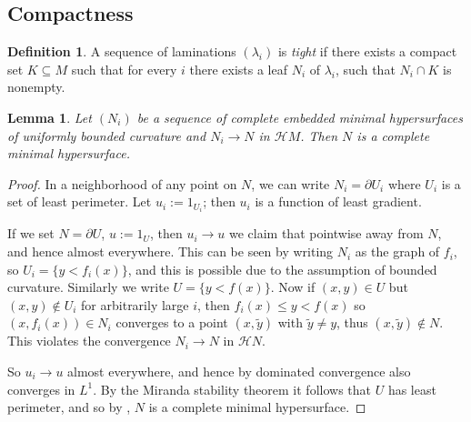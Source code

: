 \documentclass[reqno,11pt]{amsart}
\newcommand{\Hypspace}{\mathscr H}
\newcommand{\dfn}[1]{\emph{#1}\index{#1}}
\newtheorem{lemma}[theorem]{Lemma}
\theoremstyle{definition}
\newtheorem{definition}[theorem]{Definition}
\numberwithin{equation}{section}
\begin{document}
\subsection{Compactness}
\begin{definition}
A sequence of laminations $(\lambda_i)$ is \dfn{tight} if there exists a compact set $K \subseteq M$ such that for every $i$ there exists a leaf $N_i$ of $\lambda_i$, such that $N_i \cap K$ is nonempty.
\end{definition}

\begin{lemma}\label{limit of minimals is minimal}
Let $(N_i)$ be a sequence of complete embedded minimal hypersurfaces of uniformly bounded curvature and $N_i \to N$ in $\Hypspace M$.
Then $N$ is a complete minimal hypersurface.
\end{lemma}
\begin{proof}
In a neighborhood of any point on $N$, we can write $N_i = \partial U_i$ where $U_i$ is a set of least perimeter.
Let $u_i := 1_{U_i}$; then $u_i$ is a function of least gradient.

If we set $N = \partial U$, $u := 1_U$, then $u_i \to u$ we claim that pointwise away from $N$, and hence almost everywhere.
This can be seen by writing $N_i$ as the graph of $f_i$, so $U_i = \{y < f_i(x)\}$, and this is possible due to the assumption of bounded curvature.
Similarly we write $U = \{y < f(x)\}$.
Now if $(x, y) \in U$ but $(x, y) \notin U_i$ for arbitrarily large $i$, then $f_i(x) \leq y < f(x)$ so $(x, f_i(x)) \in N_i$ converges to a point $(x, \tilde y)$ with $\tilde y \neq y$, thus $(x, \tilde y) \notin N$.
This violates the convergence $N_i \to N$ in $\Hypspace N$.

So $u_i \to u$ almost everywhere, and hence by dominated convergence also converges in $L^1$.
By the Miranda stability theorem it follows that $U$ has least perimeter, and so by \cite{BackusFLG}, $N$ is a complete minimal hypersurface.
\end{proof}
\end{document}
